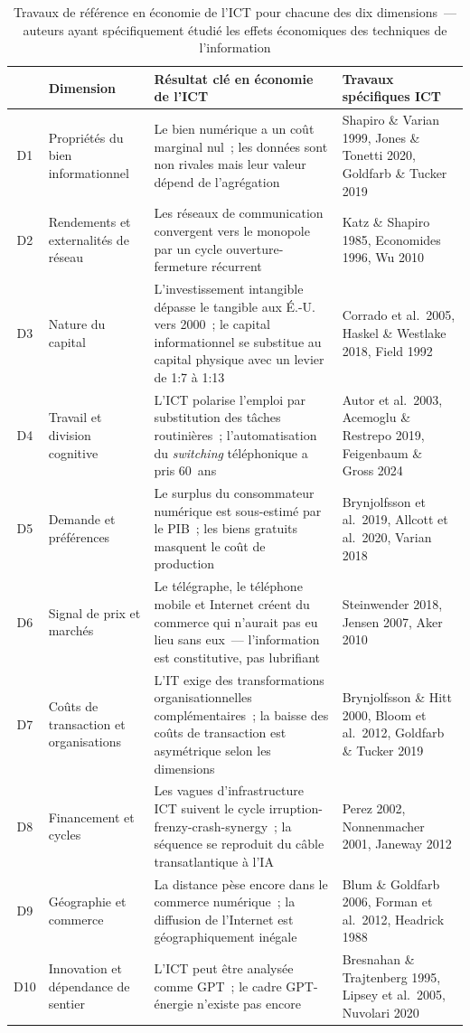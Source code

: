 \begin{table}[htbp]
\caption{Travaux de référence en économie de l'ICT pour chacune des dix dimensions~--- auteurs ayant spécifiquement étudié les effets économiques des techniques de l'information}\label{tab:dimensions-ict}
\centering\small
\begin{tabularx}{\textwidth}{@{}cp{2.8cm}Xp{4.2cm}@{}}
\toprule
 & \textbf{Dimension} & \textbf{Résultat clé en économie de l'ICT} & \textbf{Travaux spécifiques ICT} \\
\midrule
D1 & Propriétés du bien informationnel & Le bien numérique a un coût marginal nul~; les données sont non rivales mais leur valeur dépend de l'agrégation & Shapiro \& Varian 1999, Jones \& Tonetti 2020, Goldfarb \& Tucker 2019 \\[4pt]
D2 & Rendements et externalités de réseau & Les réseaux de communication convergent vers le monopole par un cycle ouverture-fermeture récurrent & Katz \& Shapiro 1985, Economides 1996, Wu 2010 \\[4pt]
D3 & Nature du capital & L'investissement intangible dépasse le tangible aux É.-U. vers 2000~; le capital informationnel se substitue au capital physique avec un levier de 1:7 à 1:13 & Corrado et al.\ 2005, Haskel \& Westlake 2018, Field 1992 \\[4pt]
D4 & Travail et division cognitive & L'ICT polarise l'emploi par substitution des tâches routinières~; l'automatisation du \emph{switching} téléphonique a pris 60~ans & Autor et al.\ 2003, Acemoglu \& Restrepo 2019, Feigenbaum \& Gross 2024 \\[4pt]
D5 & Demande et préférences & Le surplus du consommateur numérique est sous-estimé par le PIB~; les biens gratuits masquent le coût de production & Brynjolfsson et al.\ 2019, Allcott et al.\ 2020, Varian 2018 \\[4pt]
D6 & Signal de prix et marchés & Le télégraphe, le téléphone mobile et Internet créent du commerce qui n'aurait pas eu lieu sans eux~--- l'information est constitutive, pas lubrifiant & Steinwender 2018, Jensen 2007, Aker 2010 \\[4pt]
D7 & Coûts de transaction et organisations & L'IT exige des transformations organisationnelles complémentaires~; la baisse des coûts de transaction est asymétrique selon les dimensions & Brynjolfsson \& Hitt 2000, Bloom et al.\ 2012, Goldfarb \& Tucker 2019 \\[4pt]
D8 & Financement et cycles & Les vagues d'infrastructure ICT suivent le cycle irruption-frenzy-crash-synergy~; la séquence se reproduit du câble transatlantique à l'IA & Perez 2002, Nonnenmacher 2001, Janeway 2012 \\[4pt]
D9 & Géographie et commerce & La distance pèse encore dans le commerce numérique~; la diffusion de l'Internet est géographiquement inégale & Blum \& Goldfarb 2006, Forman et al.\ 2012, Headrick 1988 \\[4pt]
D10 & Innovation et dépendance de sentier & L'ICT peut être analysée comme GPT~; le cadre GPT-énergie n'existe pas encore & Bresnahan \& Trajtenberg 1995, Lipsey et al.\ 2005, Nuvolari 2020 \\
\bottomrule
\end{tabularx}
\end{table}
\fi


